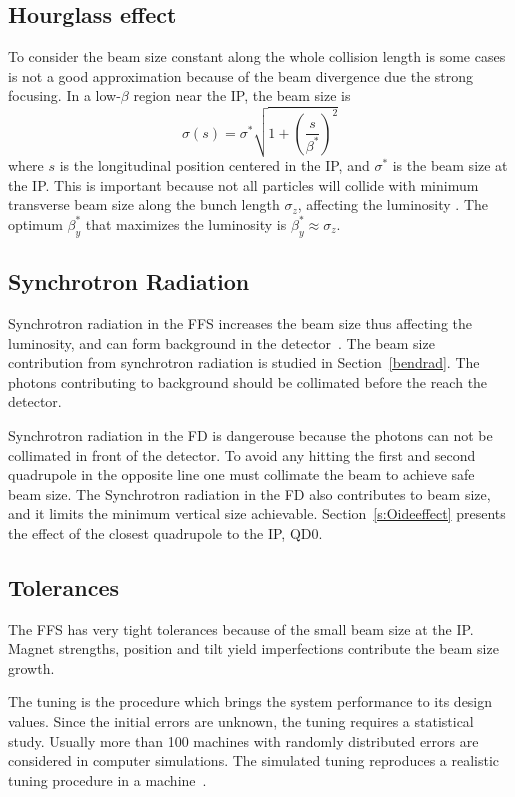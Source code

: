 \subsection{Hourglass effect}
To consider the beam size constant along the whole collision length is some cases is not a good approximation because of the beam divergence due the strong focusing. In a low-$\beta$ region near the IP, the beam size is
\begin{equation}
 \sigma(s)=\sigma^*\sqrt{1+\left(\frac{s}{\beta^*}\right)^2}
\end{equation}
where $s$ is the longitudinal position centered in the IP, and $\sigma^*$ is the beam size at the IP. This is important because not all particles will collide with minimum transverse beam size along the bunch length $\sigma_z$, affecting the luminosity \cite{chao}. The optimum $\beta_y^*$ that maximizes the luminosity is $\beta_y^*\approx\sigma_z$.\par
\subsection{Synchrotron Radiation}
Synchrotron radiation in the FFS increases the beam size \cite{Sands} thus affecting the luminosity, and can form background in the detector~\cite{Schulte:331845}. The beam size contribution from synchrotron radiation is studied in Section~\ref{bendrad}. The photons contributing to background should be collimated before the reach the detector.\par
Synchrotron radiation in the FD is dangerouse because the photons can not be collimated in front of the detector. To avoid any hitting the first and second quadrupole in the opposite line one must collimate the beam to achieve safe beam size. The Synchrotron radiation in the FD also contributes to beam size, and it limits the minimum vertical size achievable. Section~\ref{s:Oideeffect} presents the effect of the closest quadrupole to the IP, QD0.\par
\subsection{Tolerances}
The FFS has very tight tolerances because of the small beam size at the IP. Magnet strengths, position and tilt yield imperfections contribute the beam size growth.\par
The tuning is the procedure which brings the system performance to its design values. Since the initial errors are unknown, the tuning requires a statistical study. Usually more than 100 machines with randomly distributed errors are considered in computer simulations. The simulated tuning reproduces a realistic tuning procedure in a machine~\cite{GarciaMorales:1982827,Minty:629879}.\par
